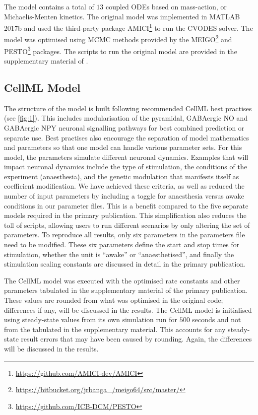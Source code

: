 \documentclass[fleqn,10pt]{physiome}
\begin{document}
The model contains a total of $13$ coupled ODEs based on mass-action, or Michaelis-Menten kinetics. The original model was implemented in MATLAB 2017b and used the third-party package AMICI\footnote{\url{https://github.com/AMICI-dev/AMICI}} to run the CVODES solver. The model was optimised using MCMC methods provided by the MEIGO\footnote{\url{https://bitbucket.org/jrbanga\_/meigo64/src/master/}} and PESTO\footnote{\url{https://github.com/ICB-DCM/PESTO}} packages. The scripts to run the original model are provided in the supplementary material of \cite{Sten2020}.


\subsection{CellML Model}

The structure of the model is built following recommended CellML best practises (see \autoref{fig:1}). This includes modularisation of the pyramidal, GABAergic NO and GABAergic NPY neuronal signalling pathways for best combined prediction or separate use. Best practises also encourage the separation of model mathematics and parameters so that one model can handle various parameter sets. For this model, the parameters simulate different neuronal dynamics. Examples that will impact neuronal dynamics include the type of stimulation, the conditions of the experiment (anaesthesia), and the genetic modulation that manifests itself as coefficient modification. We have achieved these criteria, as well as reduced the number of input parameters by including a toggle for anaesthesia versus awake conditions in our parameter files. This is a benefit compared to the five separate models required in the primary publication. This simplification also reduces the toll of scripts, allowing users to run different scenarios by only altering the set of parameters. To reproduce all results, only six parameters in the parameters file need to be modified. These six parameters define the start and stop times for stimulation, whether the unit is ``awake'' or ``anaesthetised'', and finally the stimulation scaling constants are discussed in detail in the primary publication.

The CellML model was executed with the optimised rate constants and other parameters tabulated in the supplementary material of the primary publication. These values are rounded from what was optimised in the original code; differences if any, will be discussed in the results. The CellML model is initialised using steady-state values from its own simulation run for $500$ seconds and not from the tabulated in the supplementary material. This accounts for any steady-state result errors that may have been caused by rounding. Again, the differences will be discussed in the results.
\end{document}
